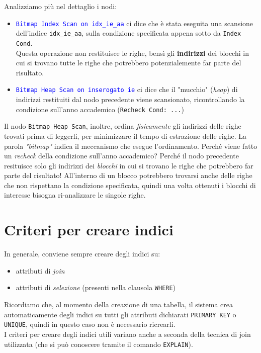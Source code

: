 \documentclass[12pt,a4paper]{book}
\begin{document}
	Analizziamo più nel dettaglio i nodi:
	\begin{itemize}
		\item \textcolor{blue}{\texttt{Bitmap Index Scan on idx_ie_aa}} ci dice che è stata eseguita una scansione dell'indice \texttt{idx_ie_aa},
		sulla condizione specificata appena sotto da \texttt{Index Cond}. \\Questa operazione non restituisce le righe, bensì gli \textbf{indirizzi} dei blocchi in cui si trovano tutte le righe che potrebbero potenzialemente far parte del risultato.
		\item \textcolor{blue}{\texttt{Bitmap Heap Scan on inserogato ie}} ci dice che il "mucchio" (\textit{heap}) di indirizzi restituiti dal nodo precedente viene scansionato, ricontrollando la condizione sull'anno accademico (\texttt{Recheck Cond: ...})
	\end{itemize}
	Il nodo \texttt{Bitmap Heap Scan}, inoltre, ordina \textit{fisicamente} gli indirizzi delle righe trovati prima di leggerli, per minimizzare il tempo di estrazione delle righe. La parola \textit{"bitmap"} indica il meccanismo che esegue l'ordinamento.
	Perché viene fatto un \textit{recheck} della condizione sull'anno accademico? Perché il nodo precedente resituisce solo gli indirizzi dei \textit{blocchi} in cui si trovano le righe che potrebbero far parte del risultato! All'interno di un blocco potrebbero trovarsi anche delle righe che non rispettano la condizione specificata, quindi una volta ottenuti i blocchi di interesse bisogna ri-analizzare le singole righe.
	\section{Criteri per creare indici}
	In generale, conviene sempre creare degli indici su: 
	\begin{itemize}
		\item attributi di \textit{join}
		\item attributi di \textit{selezione} (presenti nella clausola \texttt{WHERE})
	\end{itemize}
	Ricordiamo che, al momento della creazione di una tabella, il sistema crea automaticamente degli indici su tutti gli attributi dichiarati \texttt{PRIMARY KEY} o \texttt{UNIQUE}, quindi in questo caso non è necessario ricrearli.\\
	I criteri per creare degli indici utili variano anche a seconda della tecnica di join utilizzata (che si può conoscere tramite il comando \texttt{EXPLAIN}). 
\end{document}
